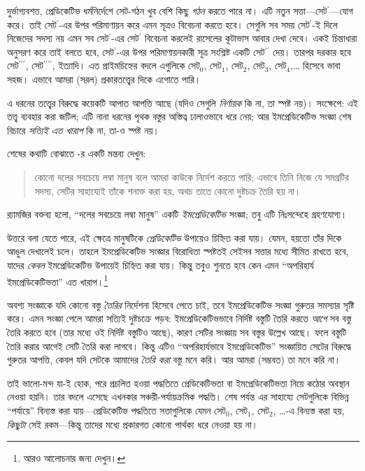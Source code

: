 \documentclass[../../../include/open-logic-section]{subfiles}
\begin{document}
দুর্ভাগ্যবশত, প্রেডিকেটিভ ধর্মনির্দেশে সেট-গঠন খুব বেশি কিছু
\emph{গঠন} করতে পারে না। এটি নতুন সত্তা—সেট$^\prime$—যোগ করে।
তাই সেট$^\prime$-এর উপর পরিমাণায়ন করে এমন সূত্রও বিবেচনা
করতে হবে। সেগুলি সব সময় সেট$^\prime$-ই দিলে নিজেদের সদস্য
নয় এমন সব সেট$^\prime$-এর সেট$^\prime$ বিবেচনা করলেই
রাসেলের কূটাভাস আবার দেখা দেবে। একই চিন্তাধারা অনুসরণ করে
তাই বলতে হবে, সেট$^\prime$-এর উপর পরিমাণায়নকারী সূত্র
সংশ্লিষ্ট একটি সেট$^{\prime\prime}$ দেয়। তারপর দরকার হবে
সেট$^{\prime\prime\prime}$, সেট$^{\prime\prime\prime\prime}$,
ইত্যাদি। এত প্রাইমচিহ্নের বদলে এগুলিকে সেট$_0$, সেট$_1$,
সেট$_2$, সেট$_3$, সেট$_4$,\ldots{} হিসেবে ভাবা সহজ। এভাবে
আমরা (সরল) প্রকারতত্ত্বের দিকে এগোতে পারি।

এ ধরনের তত্ত্বের বিরুদ্ধে কয়েকটি আপাত আপত্তি আছে (যদিও
সেগুলি \emph{নির্ণায়ক} কি না, তা স্পষ্ট নয়)। সংক্ষেপে:
এই তত্ত্ব ব্যবহার করা জটিল; এটি নানা ধরনের পৃথক বস্তুর অস্তিত্ব
ঢালাওভাবে ধরে নেয়; আর ইমপ্রেডিকেটিভ সংজ্ঞা শেষ বিচারে
\emph{সত্যিই এত খারাপ} কি না, তা-ও স্পষ্ট নয়।

শেষের কথাটি বোঝাতে \citeauthor{Ramsey1925}-র একটি মন্তব্য দেখুন:
\begin{quote}
  কোনো দলের সবচেয়ে লম্বা মানুষ বলে আমরা কাউকে নির্দেশ করতে
  পারি; এভাবে তিনি নিজে যে সমগ্রটির সদস্য, সেটির সাহায্যেই
  তাঁকে শনাক্ত করা হয়, অথচ তাতে কোনো দুষ্টচক্র তৈরি হয় না।
  \citep{Ramsey1925}
\end{quote}
র‍্যামজির বক্তব্য হলো, ``দলের সবচেয়ে লম্বা মানুষ'' একটি
\emph{ইমপ্রেডিকেটিভ} সংজ্ঞা; তবু এটি নিঃসন্দেহে গ্রহণযোগ্য।

উত্তরে বলা যেতে পারে, এই ক্ষেত্রে মানুষটিকে
\emph{প্রেডিকেটিভ} উপায়েও চিহ্নিত করা যায়। যেমন, হয়তো
তাঁর দিকে আঙুল দেখালেই চলে। তাহলে ইমপ্রেডিকেটিভ সংজ্ঞার
বিরোধিতা স্পষ্টতই সেইসব সত্তার মধ্যে সীমিত রাখতে হবে, যাদের
\emph{কেবল} ইমপ্রেডিকেটিভ উপায়েই চিহ্নিত করা যায়। কিন্তু
তবুও শুনতে হবে কেন এমন ``অপরিহার্য ইমপ্রেডিকেটিভতা'' এত
খারাপ।\footnote{আরও আলোচনার জন্য \citet{Linnebo2010} দেখুন।}

অবশ্য সংজ্ঞাকে যদি কোনো বস্তু \emph{তৈরির} নির্দেশনা হিসেবে
পেতে চাই, তবে ইমপ্রেডিকেটিভ সংজ্ঞা গুরুতর সমস্যার সৃষ্টি করে।
এমন সংজ্ঞা পেলে আমরা সত্যিই দুষ্টচক্রে পড়ব: ইমপ্রেডিকেটিভভাবে
নির্দিষ্ট বস্তুটি তৈরি করতে \emph{আগে} সব বস্তু তৈরি করতে হবে
(তার মধ্যে ওই নির্দিষ্ট বস্তুটিও আছে), কারণ সেটির সংজ্ঞায়
সব বস্তুর উল্লেখ আছে। ফলে বস্তুটি তৈরি করার আগেই সেটি তৈরি
করা লাগবে। কিন্তু এটিও ``অপরিহার্যভাবে ইমপ্রেডিকেটিভ''
সংজ্ঞায়িত সেটের বিরুদ্ধে গুরুতর আপত্তি, কেবল যদি সেটকে
আমাদের \emph{তৈরি করা} বস্তু মনে করি। আর আমরা (সম্ভবত)
তা মনে করি না।

তাই ভালো-মন্দ যা-ই হোক, পরে প্রচলিত হওয়া পদ্ধতিতে
প্রেডিকেটিভতা বা ইমপ্রেডিকেটিভতা নিয়ে কঠোর অবস্থান নেওয়া
হয়নি। তার বদলে এসেছে এখনকার সঞ্চয়ী-পর্যায়ক্রমিক পদ্ধতি।
শেষ পর্যন্ত এর সাহায্যে সেটগুলিকে বিভিন্ন ``পর্যায়ে''
বিন্যস্ত করা যায়—প্রেডিকেটিভ পদ্ধতিতে সত্তাগুলিকে যেমন
সেট$_0$, সেট$_1$, সেট$_2$, \ldots{}-এ বিন্যস্ত করা হয়,
\emph{কিছুটা} সেই রকম—কিন্তু তাদের মধ্যে প্রকারগত কোনো
পার্থক্য ধরে নেওয়া হয় না।
\end{document}
